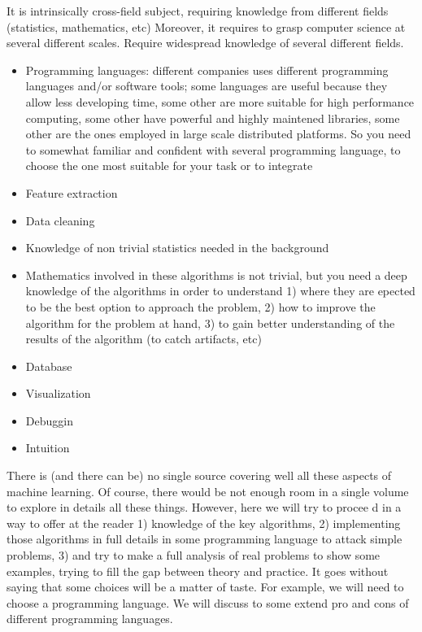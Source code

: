 It is intrinsically cross-field subject, requiring knowledge from different
fields (statistics, mathematics, etc)
Moreover, it requires to grasp computer science at several different scales.
Require widespread knowledge  of several different fields.
\begin{itemize}
\item Programming languages: different companies uses different programming
   languages and/or software tools; some languages are useful because they
   allow less developing time, some other are more suitable for high
   performance computing, some other have powerful and highly maintened
   libraries, some other are the ones employed in large scale distributed
   platforms. So you need to somewhat familiar and confident with several
   programming language, to choose the one most suitable for your task or to
   integrate 
\item Feature extraction
\item Data cleaning
\item Knowledge of non trivial statistics  needed in the background
\item Mathematics involved in these algorithms is not trivial, but you need a
   deep knowledge of the algorithms in order to understand 1) where they are
   epected to be the best option to approach the problem, 2) how to improve the
   algorithm for the problem at hand, 3) to gain better understanding of the
   results of the algorithm (to catch artifacts, etc)
\item Database
\item Visualization
\item Debuggin
\item Intuition
\end{itemize}

There is (and there can be) no single source covering well all these aspects of
machine learning. Of course, there would be not enough room in a single volume to explore
in details all these things. However, here we will try to procee d in a way to
offer at the reader 1) knowledge of the key algorithms, 2) implementing those
algorithms in full details in some programming language to attack simple
problems, 3) and try to make a full analysis of real problems to show some
examples, trying to
fill the gap between theory and practice. It goes without saying that some
choices will be a matter of taste. For example, we will need to choose a
programming language. We will discuss to some extend pro and cons of different
programming languages.

